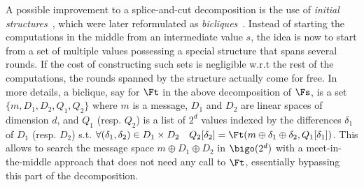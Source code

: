 A possible improvement to a splice-and-cut decomposition is the use of \emph{initial structures}~\cite{SA09}, which were later reformulated as \emph{bicliques}~\cite{KRS12}.
Instead of starting the computations in the middle from an intermediate value $s$, the idea is now to start from a set of multiple values
possessing a special structure that spans several rounds. If the cost of constructing such sets is negligible w.r.t the rest of the computations,
the rounds spanned by the structure actually come for free. In more details, a biclique, say for $\Ft$ in the above
decomposition of $\Fs$, is a set $\{m,D_1,D_2,Q_1,Q_2\}$ where $m$ is a message,
$D_1$ and $D_2$ are linear spaces of dimension $d$, and $Q_1$ (resp. $Q_2$) is a list of $2^d$ values indexed by the differences $\delta_1$
of $D_1$ (resp. $D_2$) s.t. $\forall (\delta_1, \delta_2) \in D_1 \times D_2\quad Q_2[\delta_2] = \Ft(m \oplus \delta_1 \oplus \delta_2, Q_1[\delta_1])$.
This allows to search the message space $m \oplus D_1 \oplus D_2$ in $\bigo(2^d)$
with a meet-in-the-middle approach that does not need any call to $\Ft$,
essentially bypassing this part of the decomposition.
